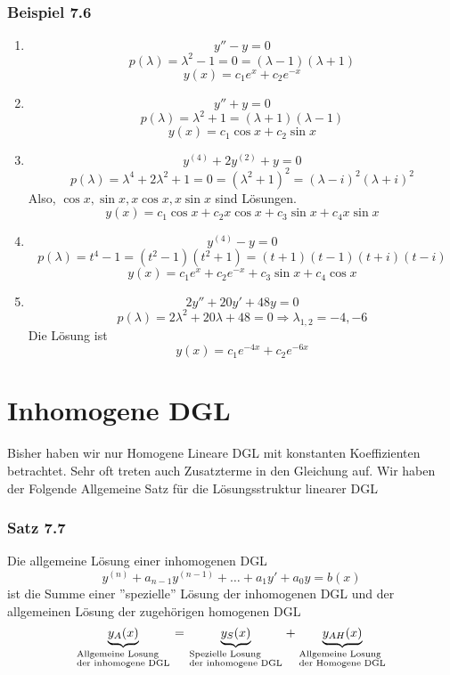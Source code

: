 \subsubsection*{Beispiel 7.6}
\begin{enumerate}
\item $$y''-y=0$$
$$p(\lambda)=\lambda^2-1=0=(\lambda-1)(\lambda+1)$$
$$y(x)=c_1e^x+c_2e^{-x}$$
\item $$y''+y=0$$
$$p(\lambda)=\lambda^2+1=(\lambda+1)(\lambda-1)$$
$$y(x)=c_1\cos x+c_2\sin x$$
\item $$y^{(4)}+2y^{(2)}+y=0$$
$$p(\lambda)=\lambda^4+2\lambda^2+1=0=(\lambda^2+1)^2=(\lambda-i)^2(\lambda+i)^2$$
Also, $\cos x, \sin x, x\cos x,x\sin x$ sind Lösungen. $$y(x)=c_1\cos x+c_2 x\cos x+c_3\sin x+c_4 x\sin x$$
\item $$y^{(4)}-y=0$$
$$p(\lambda)=t^4-1=(t^2-1)(t^2+1)=(t+1)(t-1)(t+i)(t-i)$$
$$y(x)=c_1e^x+c_2e^{-x}+c_3\sin x+c_4\cos x$$
\item $$2y''+20y'+48y=0$$
$$p(\lambda)=2\lambda^2 +20\lambda+48=0\Rightarrow \lambda_{1,2}=-4,-6$$ 
Die Lösung ist $$y(x)=c_1e^{-4x}+c_2e^{-6x}$$
\end{enumerate}
\section{Inhomogene DGL}
Bisher haben wir nur Homogene Lineare DGL mit konstanten Koeffizienten betrachtet. Sehr oft treten auch Zusatzterme in den Gleichung auf. Wir haben der Folgende Allgemeine Satz für die Lösungsstruktur linearer DGL
\subsubsection*{Satz 7.7}
Die allgemeine Lösung einer inhomogenen DGL $$y^{(n)}+a_{n-1}y^{(n-1)}+\dots +a_1y'+a_0y=b(x)$$ ist die Summe einer ''spezielle'' Lösung der inhomogenen DGL und der allgemeinen Lösung der zugehörigen homogenen DGL $$\underbrace {{y_A}(x)}_{\scriptstyle{\text{Allgemeine Losung }}\hfill\atop
\scriptstyle{\text{der inhomogene DGL}}\hfill} = \underbrace {{y_S}(x)}_{\scriptstyle{\text{Spezielle Losung }}\hfill\atop
\scriptstyle{\text{der inhomogene DGL}}\hfill} + \underbrace {{y_{AH}}(x)}_{\scriptstyle{\text{Allgemeine Losung }}\hfill\atop
\scriptstyle{\text{der Homogene DGL}}\hfill}$$
